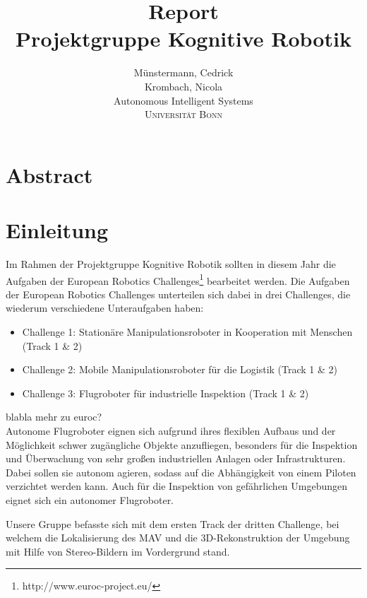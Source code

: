 \documentclass[12pt,titlepage, a4paper]{article}
\begin{document}
\title{Report\\Projektgruppe Kognitive Robotik}

\author{Münstermann,  Cedrick\\  Krombach, Nicola\\[1cm]
	Autonomous Intelligent Systems\\ \textsc{Universität Bonn}\\}



\maketitle


\section*{Abstract}


\section{Einleitung}

Im Rahmen der Projektgruppe Kognitive Robotik sollten in diesem Jahr die Aufgaben der European Robotics Challenges\footnote{http://www.euroc-project.eu/} bearbeitet werden. 
Die Aufgaben der European Robotics Challenges unterteilen sich dabei in drei Challenges, die wiederum verschiedene Unteraufgaben haben:

\begin{itemize}
 \item Challenge 1: Stationäre Manipulationsroboter in Kooperation mit Menschen (Track 1 \& 2)
 \item Challenge 2: Mobile Manipulationsroboter für die Logistik (Track 1 \& 2)
 \item Challenge 3: Flugroboter für industrielle Inspektion (Track 1 \& 2)
\end{itemize}

blabla mehr zu euroc? \\
Autonome Flugroboter eignen sich aufgrund ihres flexiblen Aufbaus und der Möglichkeit schwer zugängliche Objekte anzufliegen, besonders für die Inspektion und Überwachung von sehr großen industriellen
Anlagen oder Infrastrukturen. Dabei sollen sie autonom agieren, sodass auf die Abhängigkeit von einem Piloten verzichtet werden kann.
Auch für die Inspektion von gefährlichen Umgebungen eignet sich ein autonomer Flugroboter.

Unsere Gruppe befasste sich mit dem ersten Track der dritten Challenge, bei welchem die Lokalisierung des MAV und die 3D-Rekonstruktion der Umgebung mit Hilfe von Stereo-Bildern
im Vordergrund stand.
\end{document}
